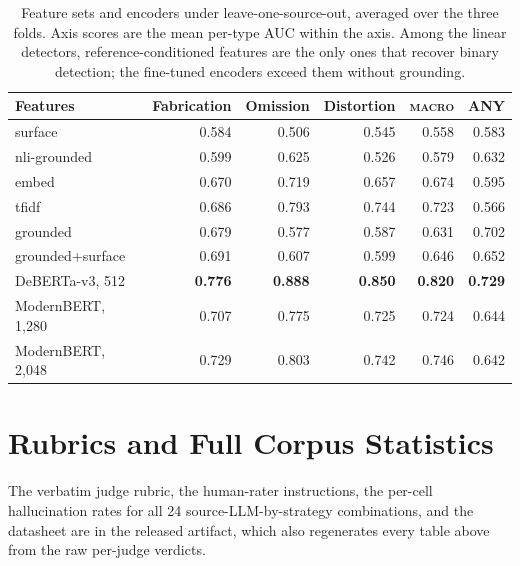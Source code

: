\begin{table}[H]
\caption{Feature sets and encoders under leave-one-source-out, averaged over
the three folds. Axis scores are the mean per-type AUC within the axis. Among
the linear detectors, reference-conditioned features are the only ones that
recover binary detection; the fine-tuned encoders exceed them without
grounding.}
\label{tab:grounded}
\centering\small
\begin{tabular}{lrrrrr}
\toprule
Features & Fabrication & Omission & Distortion & \textsc{macro} & ANY \\
\midrule
surface             & 0.584 & 0.506 & 0.545 & 0.558 & 0.583 \\
nli-grounded        & 0.599 & 0.625 & 0.526 & 0.579 & 0.632 \\
embed               & 0.670 & 0.719 & 0.657 & 0.674 & 0.595 \\
tfidf               & 0.686 & 0.793 & 0.744 & 0.723 & 0.566 \\
grounded            & 0.679 & 0.577 & 0.587 & 0.631 & 0.702 \\
grounded+surface    & 0.691 & 0.607 & 0.599 & 0.646 & 0.652 \\
\midrule
DeBERTa-v3, 512     & \textbf{0.776} & \textbf{0.888} & \textbf{0.850} & \textbf{0.820} & \textbf{0.729} \\
ModernBERT, 1{,}280 & 0.707 & 0.775 & 0.725 & 0.724 & 0.644 \\
ModernBERT, 2{,}048 & 0.729 & 0.803 & 0.742 & 0.746 & 0.642 \\
\bottomrule
\end{tabular}
\end{table}

\section{Rubrics and Full Corpus Statistics}
\label{app:rubrics}

The verbatim judge rubric, the human-rater instructions, the per-cell
hallucination rates for all 24 source-LLM-by-strategy combinations, and the
datasheet are in the released artifact, which also regenerates every table
above from the raw per-judge verdicts.
